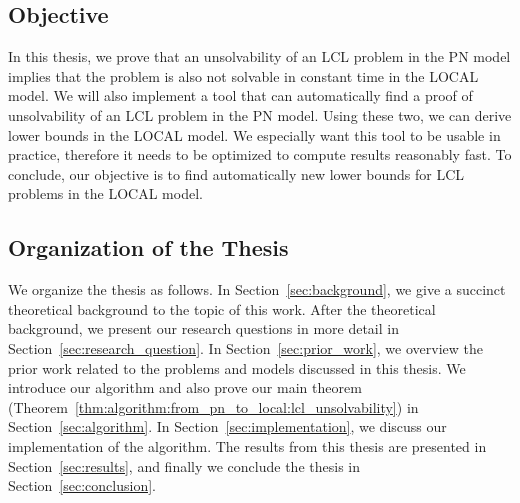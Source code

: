 \subsection{Objective}
In this thesis, we prove that an unsolvability of an LCL problem in the PN model implies that the problem is also not solvable in constant time in the LOCAL model.
We will also implement a tool that can automatically find a proof of unsolvability of an LCL problem in the PN model.
Using these two, we can derive lower bounds in the LOCAL model.
We especially want this tool to be usable in practice, therefore it needs to be optimized to compute results reasonably fast.
To conclude, our objective is to find automatically new lower bounds for LCL problems in the LOCAL model.

\subsection{Organization of the Thesis}
We organize the thesis as follows.
In Section~\ref{sec:background}, we give a succinct theoretical background to the topic of this work.
After the theoretical background, we present our research questions in more detail in Section~\ref{sec:research_question}.
In Section~\ref{sec:prior_work}, we overview the prior work related to the problems and models discussed in this thesis.
We introduce our algorithm and also prove our main theorem (Theorem~\ref{thm:algorithm:from_pn_to_local:lcl_unsolvability}) in Section~\ref{sec:algorithm}.
In Section~\ref{sec:implementation}, we discuss our implementation of the algorithm.
The results from this thesis are presented in Section~\ref{sec:results}, and finally we conclude the thesis in Section~\ref{sec:conclusion}.
